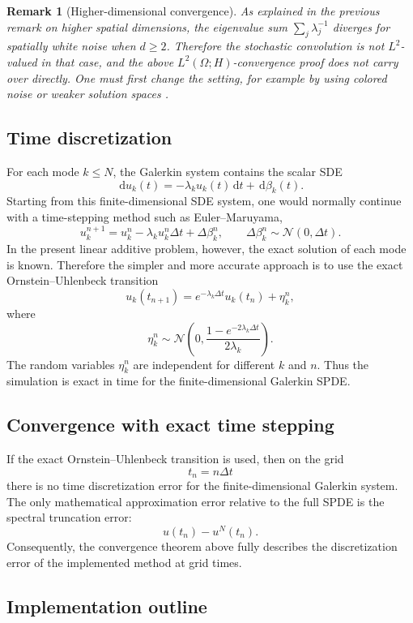 \documentclass[11pt,a4paper]{article}
\newtheorem{remark}[theorem]{Remark}
\newcommand{\dd}{\,\mathrm{d}}
\begin{document}
\begin{remark}[Higher-dimensional convergence]
As explained in the previous remark on higher spatial dimensions, the
eigenvalue sum \(\sum_j\lambda_j^{-1}\) diverges for spatially white noise when
\(d\ge2\). Therefore the stochastic convolution is not \(L^2\)-valued in that
case, and the above \(L^2(\Omega;H)\)-convergence proof does not carry over
directly. One must first change the setting, for example by using colored
noise or weaker solution spaces \cite{daPratoZabczyk,lordPowellShardlow}.
\end{remark}

\subsection{Time discretization}

For each mode \(k\le N\), the Galerkin system contains the scalar SDE
\[
  \dd u_k(t)=-\lambda_k u_k(t)\dd t+\dd\beta_k(t).
\]
Starting from this finite-dimensional SDE system, one would normally continue
with a time-stepping method such as Euler--Maruyama,
\[
  u_k^{n+1}
  =
  u_k^n-\lambda_k u_k^n\Delta t+\Delta\beta_k^n,
  \qquad
  \Delta\beta_k^n\sim\mathcal N(0,\Delta t).
\]
In the present linear additive problem, however, the exact solution of each
mode is known. Therefore the simpler and more accurate approach is to use the
exact Ornstein--Uhlenbeck transition
\[
  u_k(t_{n+1})
  =
  e^{-\lambda_k\Delta t}u_k(t_n)+\eta_k^n,
\]
where
\[
  \eta_k^n
  \sim
  \mathcal N\left(
    0,
    \frac{1-e^{-2\lambda_k\Delta t}}{2\lambda_k}
  \right).
\]
The random variables \(\eta_k^n\) are independent for different \(k\) and \(n\).
Thus the simulation is exact in time for the finite-dimensional Galerkin SPDE.

\subsection{Convergence with exact time stepping}

If the exact Ornstein--Uhlenbeck transition is used, then on the grid
\[
  t_n=n\Delta t
\]
there is no time discretization error for the finite-dimensional Galerkin
system. The only mathematical approximation error relative to the full SPDE is
the spectral truncation error:
\[
  u(t_n)-u^N(t_n).
\]
Consequently, the convergence theorem above fully describes the discretization
error of the implemented method at grid times.

\subsection{Implementation outline}
\end{document}
